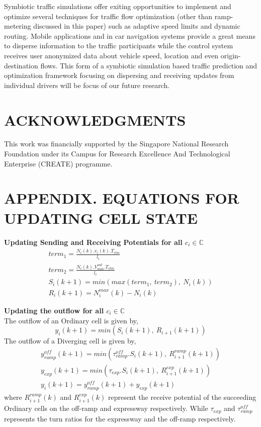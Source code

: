 \documentclass{wscpaperproc}
\theoremstyle{wsc}
\begin{document}
Symbiotic traffic simulations offer exiting opportunities to implement and optimize several techniques for traffic flow optimization (other than ramp-metering discussed in this paper) such as adaptive speed limits and dynamic routing. Mobile applications and in car navigation systems provide a great means to disperse information to the traffic participants while the control system receives user anonymized data about vehicle speed, location and even origin-destination flows. This form of a symbiotic simulation based traffic prediction and optimization framework focusing on dispersing and receiving updates from individual drivers will be focus of our future research.

\section*{ACKNOWLEDGMENTS}
This work was financially supported by the Singapore National Research Foundation under its Campus for Research Excellence And Technological Enterprise (CREATE) programme.
\appendix

\section{APPENDIX. EQUATIONS FOR UPDATING CELL STATE}
\label{appendix:a}

\textbf{Updating Sending and Receiving Potentials for all $c_i\in \mathbb{C}$}\\
\begin{subequations} 
\label{eq:sp-rp}
\begin{eqnarray}
term_1=\frac{N_i(k).v_i(k).T_{ctm}}{l_i}\\
term_2=\frac{N_i(k).V^{out}_{min}.T_{ctm}}{l_i}\\
S_i(k+1)= min(max(term_1,~term_2),~N_i(k))\\
R_i(k+1)=N_i^{max}(k)-N_i(k)
\end{eqnarray}
\end{subequations}


\textbf{Updating the outflow for all $c_i\in \mathbb{C}$}\\
 The outflow of an Ordinary cell is given by,
 \begin{equation}
 y_i(k+1)=min(S_i(k+1),~R_{i+1}(k+1))
 \end{equation}
The outflow of a Diverging cell is given by,
 \begin{subequations} 
 \label{eq:diverging-outflow}
 \begin{eqnarray}
 y_{ramp}^{off}(k+1)=min(\tau_{ramp}^{off}.S_i(k+1),~R_{i+1}^{ramp}(k+1))\\
 y_{exp}(k+1)=min(\tau_{exp}.S_i(k+1),~R_{i+1}^{exp}(k+1))\\
 y_i(k+1)=y_{ramp}^{off}(k+1)+y_{exp}(k+1)
 \end{eqnarray}
 \end{subequations}
where $R_{i+1}^{ramp}(k)$ and $R_{i+1}^{exp}(k)$ represent the receive potential of the succeeding Ordinary cells on the off-ramp and expressway respectively. While  $\tau_{exp}$ and $\tau_{ramp}^{off}$ represents the turn ratios for the expressway and the off-ramp  respectively.
\end{document}
